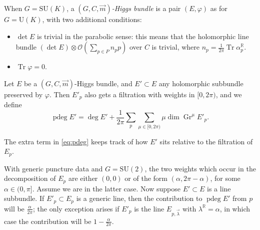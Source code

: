 \documentclass[12pt,letterpaper,reqno]{article}
\numberwithin{equation}{section}
\newcommand{\cO}{\ensuremath{\mathcal O}}
\newcommand{\R}{\ensuremath{\mathbb R}}
\newcommand{\ti}[1]{\textit{#1}}
\DeclareMathOperator{\Tr}{Tr}
\DeclareMathOperator{\pdeg}{pdeg}
\DeclareMathOperator{\Gr}{Gr}
\newcommand{\SU}{\mathrm{SU}}
\newcommand{\U}{\mathrm{U}}
\begin{document}

\begin{defn}[Parabolic Higgs bundles for $G = \SU(K)$]
When $G = \SU(K)$, a \ti{$(G,C,\vec m)$-Higgs bundle} 
is a pair $(E, \varphi)$ as for $G = \U(K)$, with two additional conditions:
\begin{itemize} 
\item $\det E$ is trivial in the parabolic sense: this means
that the holomorphic line bundle $(\det E) \otimes \cO\left(\sum_{p \in P} n_p p\right)$ over $C$ is trivial, where $n_p = \frac{1}{2\pi}\Tr \alpha_p^\R$.
\item $\Tr \varphi = 0$.
\end{itemize}
\end{defn}

\begin{defn}
Let $E$ be a $(G, C, \vec m)$-Higgs bundle,
and $E' \subset E$ any holomorphic subbundle preserved by
$\varphi$. Then $E'_p$ also gets a filtration with
weights in $[0,2\pi)$, and we define
\begin{equation} \label{eq:pdeg}
  \pdeg E' = \deg E' + \frac{1}{2\pi} \sum_p \sum_{\mu \in [0,2\pi)} \mu \dim \Gr^\mu E'_p.
\end{equation}
\end{defn}

The extra term in \eqref{eq:pdeg} keeps track of how $E'$
sits relative to the filtration of $E_p$.

\begin{example}
With generic puncture data and $G = \SU(2)$,
the two weights which occur in the decomposition of 
$E_p$ are either $(0,0)$ or of the form
$(\alpha, 2\pi-\alpha)$, for some $\alpha \in (0,\pi]$.
Assume we are in the latter case.
Now suppose $E' \subset E$ is a line subbundle.
If $E'_p \subset E_p$ is a generic line, then the contribution
to $\pdeg E'$ from $p$ will be $\frac{\alpha}{2\pi}$; the
only exception arises if $E'_p$ is the line 
$E_{p,\vec\lambda}$ with $\lambda^\R = \alpha$, in which case 
the contribution will be $1 - \frac{\alpha}{2\pi}$. 
\end{example}
\end{document}
